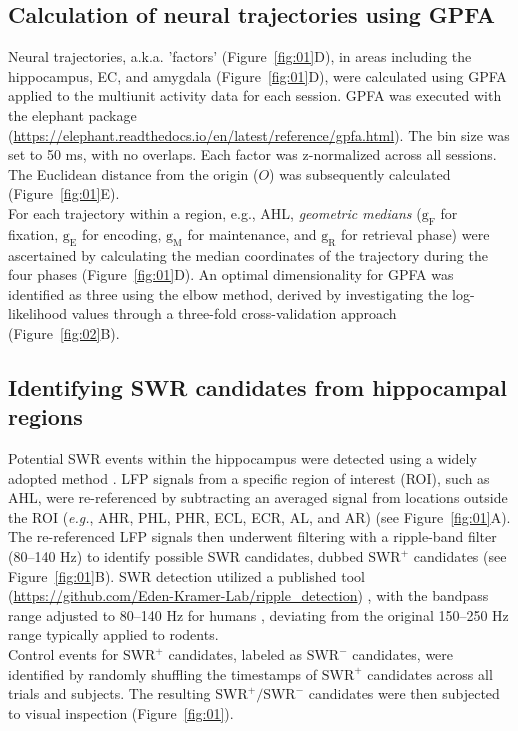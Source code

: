 \documentclass[final,3p,times,twocolumn]{elsarticle}
\begin{document}
\subsection{Calculation of neural trajectories using GPFA}
Neural trajectories, a.k.a. 'factors' (Figure~\ref{fig:01}D), in areas including the hippocampus, EC, and amygdala (Figure~\ref{fig:01}D), were calculated using GPFA \cite{yu_gaussian-process_2009} applied to the multiunit activity data for each session. GPFA was executed with the elephant package (\url{https://elephant.readthedocs.io/en/latest/reference/gpfa.html}). The bin size was set to 50 ms, with no overlaps. Each factor was z-normalized across all sessions. The Euclidean distance from the origin ($O$) was subsequently calculated (Figure~\ref{fig:01}E).
\\
\indent
For each trajectory within a region, e.g., AHL, \textit{geometric medians} ($\mathrm{g_{F}}$ for fixation, $\mathrm{g_{E}}$ for encoding, $\mathrm{g_{M}}$ for maintenance, and $\mathrm{g_{R}}$ for retrieval phase) were ascertained by calculating the median coordinates of the trajectory during the four phases (Figure~\ref{fig:01}D). An optimal dimensionality for GPFA was identified as three using the elbow method, derived by investigating the log-likelihood values through a three-fold cross-validation approach (Figure~\ref{fig:02}B).

\subsection{Identifying SWR candidates from hippocampal regions}
Potential SWR events within the hippocampus were detected using a widely adopted method \cite{liu_consensus_2022}. LFP signals from a specific region of interest (ROI), such as AHL, were re-referenced by subtracting an averaged signal from locations outside the ROI (\textit{e.g.}, AHR, PHL, PHR, ECL, ECR, AL, and AR) (see Figure~\ref{fig:01}A). The re-referenced LFP signals then underwent filtering with a ripple-band filter (80--140 Hz) to identify possible SWR candidates, dubbed $\textrm{SWR}^+$ candidates (see Figure~\ref{fig:01}B). SWR detection utilized a published tool (\url{https://github.com/Eden-Kramer-Lab/ripple_detection}) \cite{kay_hippocampal_2016}, with the bandpass range adjusted to 80--140 Hz for humans \cite{norman_hippocampal_2019} \cite{norman_hippocampal_2021}, deviating from the original 150--250 Hz range typically applied to rodents.
\\
\indent
Control events for $\textrm{SWR}^+$ candidates, labeled as $\textrm{SWR}^-$ candidates, were identified by randomly shuffling the timestamps of $\textrm{SWR}^+$ candidates across all trials and subjects. The resulting $\textrm{SWR}^+/\textrm{SWR}^-$ candidates were then subjected to visual inspection (Figure~\ref{fig:01}).
\end{document}
